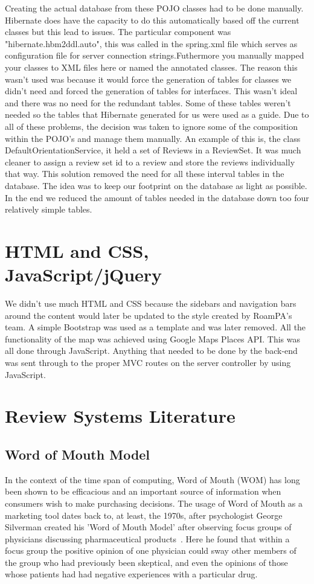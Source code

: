 Creating the actual database from these POJO classes had to be done manually. Hibernate does have the capacity to do this automatically based off the current classes but this lead to issues. The particular component was "hibernate.hbm2ddl.auto", this was called in the spring.xml file which serves as configuration file for server connection strings.Futhermore you manually mapped your classes to XML files here or named the annotated classes. The reason this wasn't used was because it would force the generation of tables for classes we didn't need and forced the generation of tables for interfaces. This wasn't ideal and there was no need for the redundant tables.  Some of these tables weren't needed so the tables that Hibernate generated for us were used as a guide. Due to all of these problems, the decision was taken to ignore some of the composition within the POJO's and manage them manually. An example of this is, the class DefaultOrientationService, it held a set of Reviews in a ReviewSet. It was much cleaner to assign a review set id to a review and store the reviews individually that way. This solution removed the need for all these interval tables in the database. The idea was to keep our footprint on the database as light as possible. In the end we reduced the amount of tables needed in the database down too four relatively simple tables.

\section{HTML and CSS, JavaScript/jQuery}

We didn't use much HTML\cite{HTML} and CSS\cite{CSS} because the sidebars and navigation bars around the content would later be updated to the style created by RoamPA's team. A simple Bootstrap\cite{Bootstrap} was used as a template and was later removed. All the functionality of the map was achieved using Google Maps Places API\cite{GoogleMaps}. This was all done through JavaScript\cite{ECMAS}. Anything that needed to be done by the back-end was sent through to the proper MVC routes on the server controller by using JavaScript.

\section{Review Systems Literature}

\subsection{Word of Mouth Model}
In the context of the time span of computing, Word of Mouth (WOM) has long been shown to be efficacious and an important source of information when consumers wish to make purchasing decisions\cite{Nielsen}. The usage of Word of Mouth as a marketing tool dates back to, at least, the 1970s, after psychologist George Silverman created his 'Word of Mouth Model' after observing focus groups of physicians discussing pharmaceutical products~\cite{WOM}. Here he found that within a focus group the positive opinion of one physician could sway other members of the group who had previously been skeptical, and even the opinions of those whose patients had had negative experiences with a particular drug.

